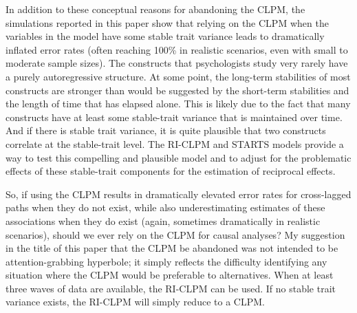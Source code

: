 \documentclass[
  english,
  man,floatsintext]{apa6}
\begin{document}
In addition to these conceptual reasons for abandoning the CLPM, the simulations reported in this paper show that relying on the CLPM when the variables in the model have some stable trait variance leads to dramatically inflated error rates (often reaching 100\% in realistic scenarios, even with small to moderate sample sizes). The constructs that psychologists study very rarely have a purely autoregressive structure. At some point, the long-term stabilities of most constructs are stronger than would be suggested by the short-term stabilities and the length of time that has elapsed alone. This is likely due to the fact that many constructs have at least some stable-trait variance that is maintained over time. And if there is stable trait variance, it is quite plausible that two constructs correlate at the stable-trait level. The RI-CLPM and STARTS models provide a way to test this compelling and plausible model and to adjust for the problematic effects of these stable-trait components for the estimation of reciprocal effects.

So, if using the CLPM results in dramatically elevated error rates for cross-lagged paths when they do not exist, while also underestimating estimates of these associations when they do exist (again, sometimes dramatically in realistic scenarios), should we ever rely on the CLPM for causal analyses? My suggestion in the title of this paper that the CLPM be abandoned was not intended to be attention-grabbing hyperbole; it simply reflects the difficulty identifying any situation where the CLPM would be preferable to alternatives. When at least three waves of data are available, the RI-CLPM can be used. If no stable trait variance exists, the RI-CLPM will simply reduce to a CLPM.
\end{document}

